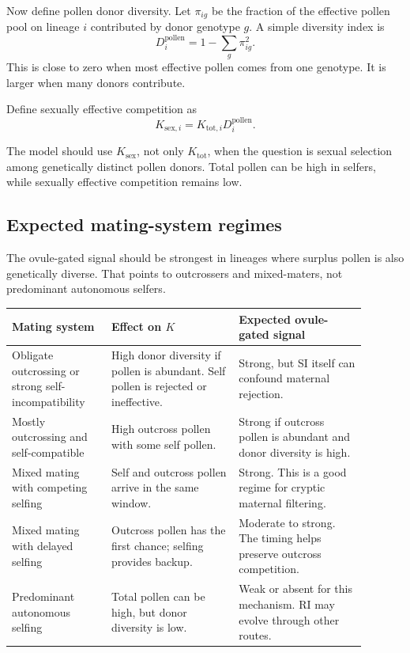 \documentclass[12pt]{article}
\newcommand{\Ktot}{K_{\mathrm{tot}}}
\newcommand{\Ksex}{K_{\mathrm{sex}}}
\begin{document}
Now define pollen donor diversity. Let $\pi_{ig}$ be the fraction of the effective pollen pool on lineage $i$ contributed by donor genotype $g$. A simple diversity index is
\begin{equation}
D^{\mathrm{pollen}}_i=1-\sum_g \pi_{ig}^2.
\label{eq:pollenDiversity}
\end{equation}
This is close to zero when most effective pollen comes from one genotype. It is larger when many donors contribute.

Define sexually effective competition as
\begin{equation}
K_{\mathrm{sex},i}=K_{\mathrm{tot},i}D^{\mathrm{pollen}}_i.
\label{eq:Ksex}
\end{equation}

\begin{conclusionbox}
The model should use $\Ksex$, not only $\Ktot$, when the question is sexual selection among genetically distinct pollen donors. Total pollen can be high in selfers, while sexually effective competition remains low.
\end{conclusionbox}

\subsection{Expected mating-system regimes}

The ovule-gated signal should be strongest in lineages where surplus pollen is also genetically diverse. That points to outcrossers and mixed-maters, not predominant autonomous selfers.

\begin{center}
\begin{tabular}{>{\raggedright\arraybackslash}p{0.25\linewidth} >{\raggedright\arraybackslash}p{0.32\linewidth} >{\raggedright\arraybackslash}p{0.32\linewidth}}
\toprule
Mating system & Effect on $K$ & Expected ovule-gated signal \\
\midrule
Obligate outcrossing or strong self-incompatibility & High donor diversity if pollen is abundant. Self pollen is rejected or ineffective. & Strong, but SI itself can confound maternal rejection. \\
Mostly outcrossing and self-compatible & High outcross pollen with some self pollen. & Strong if outcross pollen is abundant and donor diversity is high. \\
Mixed mating with competing selfing & Self and outcross pollen arrive in the same window. & Strong. This is a good regime for cryptic maternal filtering. \\
Mixed mating with delayed selfing & Outcross pollen has the first chance; selfing provides backup. & Moderate to strong. The timing helps preserve outcross competition. \\
Predominant autonomous selfing & Total pollen can be high, but donor diversity is low. & Weak or absent for this mechanism. RI may evolve through other routes. \\
\bottomrule
\end{tabular}
\end{center}
\end{document}
